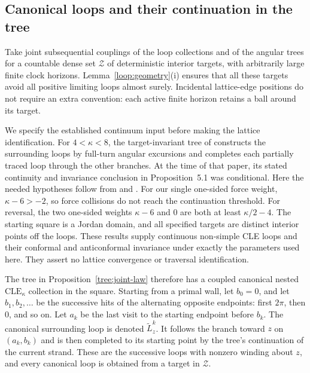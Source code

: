 \subsection{Canonical loops and their continuation in the tree}
\label{loop:canonical}

Take joint subsequential couplings of the loop collections and of the
angular trees for a countable dense set $\mathcal Z$ of deterministic
interior targets, with arbitrarily large finite clock horizons.
Lemma~\ref{loop:geometry}(i) ensures that all these targets avoid all
positive limiting loops almost surely.  Incidental lattice-edge
positions do not require an extra convention: each active finite
horizon retains a ball around its target.

We specify the established continuum input before making the lattice
identification.  For $4<\kappa<8$, the target-invariant tree of
\citet[Sections~4.2--4.3]{Sheffield2009Exploration} constructs the
surrounding loops by full-turn angular excursions and completes each
partially traced loop through the other branches.  At the time of
that paper, its stated continuity and invariance conclusion in
Proposition~5.1 was conditional.  Here the needed hypotheses follow
from \citet[Theorem~1.3]{MillerSheffield2016IG1} and
\citet[Theorem~1.2 and the ensuing CLE discussion]{MillerSheffield2016IG3}.
For our single one-sided force weight, $\kappa-6>-2$, so force
collisions do not reach the continuation threshold.  For reversal,
the two one-sided weights $\kappa-6$ and $0$ are both at least
$\kappa/2-4$.  The starting square is a Jordan domain, and all
specified targets are distinct interior points off the loops.  These
results supply continuous non-simple CLE loops and their conformal
and anticonformal invariance under exactly the parameters used here.
They assert no lattice convergence or traversal identification.

The tree in Proposition~\ref{tree:joint-law} therefore has a coupled
canonical nested $\mathrm{CLE}_\kappa$ collection in the square.
Starting from a primal wall, let $b_0=0$, and let $b_1,b_2,\ldots$
be the successive hits of the alternating opposite endpoints:
first $2\pi$, then $0$, and so on.  Let $a_k$ be the last visit to
the starting endpoint before $b_k$.  The canonical surrounding loop
is denoted $\widetilde L_z^k$.  It follows the branch toward $z$ on
$(a_k,b_k)$ and is then completed to its starting point by the tree's
continuation of the current strand.  These are the successive loops
with nonzero winding about $z$, and every canonical loop is obtained
from a target in $\mathcal Z$.

